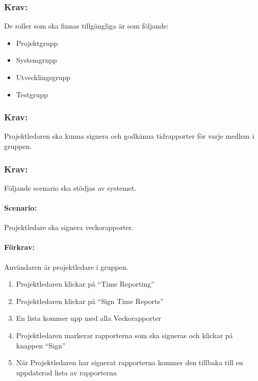 \documentclass[paper=a4, fontsize=11pt,twoside]{article}
\begin{document}
\paragraph{}
\newpage
\subsubsection{Krav:}
De roller som ska finnas tillgängliga är som följande:
\begin{itemize}
\item Projektgrupp
\item Systemgrupp
\item Utvecklingsgrupp
\item Testgrupp
\end{itemize}

\paragraph{}
\subsubsection{Krav:}
Projektledaren ska kunna signera och godkänna tidrapporter för varje medlem i gruppen.

\paragraph{}

\subsubsection{Krav:}
Följande scenario ska stödjas av systemet.
\paragraph{Scenario:}
Projektledare ska signera veckorapporter.
\paragraph{Förkrav:}
Användaren är projektledare i gruppen.
\begin{enumerate}
\item Projektledaren klickar på “Time Reporting”
\item Projektledaren klickar på “Sign Time Reports”
\item En lista kommer upp med alla Veckorapporter
\item Projektledaren markerar rapporterna som ska signeras och klickar på knappen “Sign”
\item När Projektledaren har signerat rapporterna kommer den tillbaka till en uppdaterad lista av rapporterna
\end{enumerate}
\end{document}
